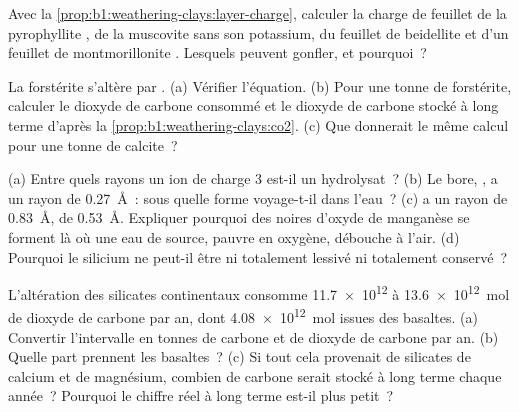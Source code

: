 \begin{exercise}[$\star\star$]\label{exo:b1:weathering-clays:8}
Avec la \cref{prop:b1:weathering-clays:layer-charge}, calculer la charge de feuillet de
la pyrophyllite , de la muscovite  sans
son potassium, du feuillet de beidellite  et
d'un feuillet de montmorillonite . Lesquels peuvent
gonfler, et pourquoi~?
\end{exercise}

\begin{exercise}[$\star\star$]\label{exo:b1:weathering-clays:9}
La forstérite  s'altère par
. (a) Vérifier
l'équation. (b) Pour une tonne de forstérite, calculer le dioxyde de carbone consommé et
le dioxyde de carbone stocké à long terme d'après la
\cref{prop:b1:weathering-clays:co2}. (c) Que donnerait le même calcul
pour une tonne de calcite~?
\end{exercise}

\begin{exercise}[$\star\star\star$]\label{exo:b1:weathering-clays:10}
(a) Entre quels rayons un ion de charge 3 est-il un hydrolysat~? (b) Le bore,
, a un rayon de \qty{0.27}{\angstrom}~: sous quelle forme voyage-t-il
dans l'eau~? (c)  a un rayon de \qty{0.83}{\angstrom},  de
\qty{0.53}{\angstrom}. Expliquer pourquoi des  noires d'oxyde de manganèse se forment là où
une eau de source, pauvre en oxygène, débouche à l'air. (d) Pourquoi le silicium ne peut-il
être ni totalement lessivé ni totalement conservé~?
\end{exercise}

\begin{exercise}[$\star\star\star$]\label{exo:b1:weathering-clays:11}
L'altération des silicates continentaux consomme \num{11.7e12} à
\qty{13.6e12}{mol} de dioxyde de carbone par an, dont \qty{4.08e12}{mol} issues des
basaltes. (a) Convertir l'intervalle en tonnes de carbone et de dioxyde de carbone par
an. (b) Quelle part prennent les basaltes~? (c) Si tout cela provenait de silicates de calcium et de
magnésium, combien de carbone serait stocké à long terme chaque
année~? Pourquoi le chiffre réel à long terme est-il plus petit~?
\end{exercise}

